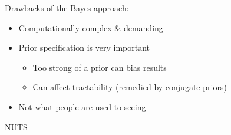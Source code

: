 \documentclass[
  ignorenonframetext,
]{beamer}
\providecommand{\tightlist}{%
  \setlength{\itemsep}{0pt}\setlength{\parskip}{0pt}}
\begin{document}
\begin{frame}{Drawbacks of the Bayes approach:}
\protect\hypertarget{drawbacks-of-the-bayes-approach}{}
\begin{itemize}
\tightlist
\item
  Computationally complex \& demanding
\item
  Prior specification is very important

  \begin{itemize}
  \tightlist
  \item
    Too strong of a prior can bias results
  \item
    Can affect tractability (remedied by conjugate priors)
  \end{itemize}
\item
  Not what people are used to seeing
\end{itemize}
\end{frame}

\begin{frame}{NUTS}
\protect\hypertarget{nuts}{}
\begin{frame}
\end{frame}
\end{frame}
\end{document}
